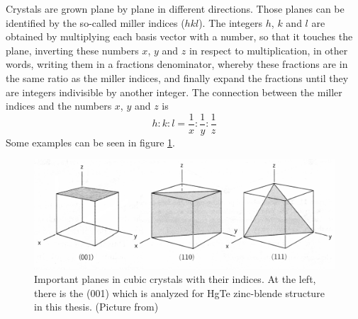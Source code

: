 
 	
	Crystals are grown plane by plane in different directions. 
	Those planes can be identified by the so-called miller indices ($hkl$).
	The integers $h$, $k$ and $l$ are obtained by multiplying each basis vector with a number, so that it touches the plane, inverting these numbers $x$, $y$ and $z$ in respect to multiplication, in other words, writing them in a fractions denominator, whereby these fractions are in the same ratio as the miller indices, and finally expand the fractions until they are integers indivisible by another integer. The connection between the miller indices and the numbers $x$, $y$ and $z$ is
	\begin{equation}
		h : k : l = \frac{1}{x} : \frac{1}{y} : \frac{1}{z}
	\end{equation}
	Some examples can be seen in figure \ref{millersche_indizes}.
	\begin{figure}[tbp]
		\centering
		\includegraphics[width=.8\linewidth]{andere_bilder/millersche_indizes_less.png}
		\caption{Important planes in cubic crystals with their indices. At the left, there is the (001) which is analyzed for HgTe zinc-blende structure in this thesis. (Picture from\cite{Kittel})} \label{millersche_indizes}
	\end{figure}
	

